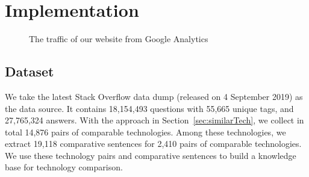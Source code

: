 \section{Implementation}
\begin{figure}%
\centering
{}%
\qquad
{}%
\qquad
{}%

\caption{The traffic of our website from Google Analytics}
\label{fig:googleanalytics}
\end{figure}

\subsection{Dataset}
We take the latest Stack Overflow data dump (released on 4 September 2019) as the data source.
It contains 18,154,493 questions with 55,665 unique tags, and 27,765,324 answers.
With the approach in Section~\ref{sec:similarTech}, we collect in total 14,876 pairs of comparable technologies.
Among these technologies, we extract 19,118 comparative sentences for 2,410 pairs of comparable technologies.
We use these technology pairs and comparative sentences to build a knowledge base for technology comparison.


